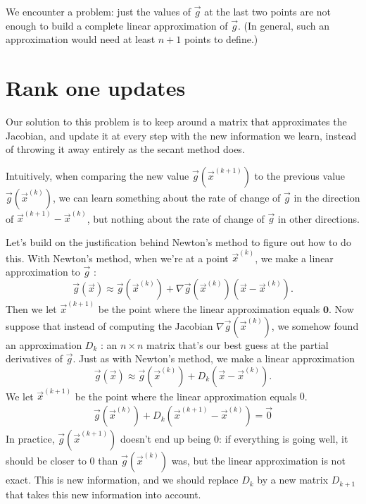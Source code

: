 \documentclass[11pt]{elegantbook}
\begin{document}
We encounter a problem: just the values of $\vec{g}$ at the last two points are not enough to build a complete linear approximation of $\vec{g}$. (In general, such an approximation would need at least $n+1$ points to define.)

\section{Rank one updates}
Our solution to this problem is to keep around a matrix that approximates the Jacobian, and update it at every step with the new information we learn, instead of throwing it away entirely as the secant method does.

Intuitively, when comparing the new value $\vec{g}\left(\vec{x}^{(k+1)}\right)$ to the previous value $\vec{g}\left(\vec{x}^{(k)}\right)$, we can learn something about the rate of change of $\vec{g}$ in the direction of $\vec{x}^{(k+1)}-\vec{x}^{(k)}$, but nothing about the rate of change of $\vec{g}$ in other directions.

Let's build on the justification behind Newton's method to figure out how to do this. With Newton's method, when we're at a point $\vec{x}^{(k)}$, we make a linear approximation to $\vec{g}$ :
$$
\vec{g}(\vec{x}) \approx \vec{g}\left(\vec{x}^{(k)}\right)+\nabla \vec{g}\left(\vec{x}^{(k)}\right)\left(\vec{x}-\vec{x}^{(k)}\right) .
$$
Then we let $\vec{x}^{(k+1)}$ be the point where the linear approximation equals $\mathbf{0}$.
Now suppose that instead of computing the Jacobian $\nabla \vec{g}\left(\vec{x}^{(k)}\right)$, we somehow found an approximation $D_k$ : an $n \times n$ matrix that's our best guess at the partial derivatives of $\vec{g}$. Just as with Newton's method, we make a linear approximation
$$
\vec{g}(\vec{x}) \approx \vec{g}(\vec{x}^{(k)})+D_k(\vec{x}-\vec{x}^{(k)}) .
$$
We let $\vec{x}^{(k+1)}$ be the point where the linear approximation equals $0$.
\begin{equation}
    \begin{aligned}
        \vec{g}(\vec{x}^{(k)})+D_k(\vec{x}^{(k+1)}-\vec{x}^{(k)})=\vec{0}
    \end{aligned}
    \nonumber
\end{equation}
In practice, $\vec{g}\left(\vec{x}^{(k+1)}\right)$ doesn't end up being $0$: if everything is going well, it should be closer to $0$ than $\vec{g}\left(\vec{x}^{(k)}\right)$ was, but the linear approximation is not exact. This is new information, and we should replace $D_k$ by a new matrix $D_{k+1}$ that takes this new information into account.
\end{document}
